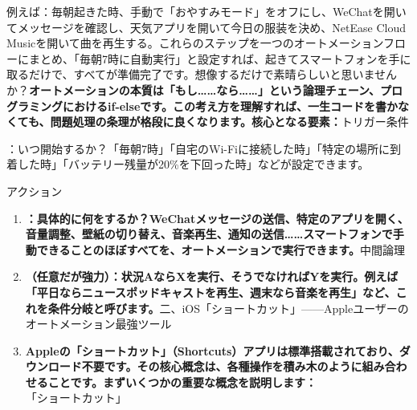 


例えば：毎朝起きた時、手動で「おやすみモード」をオフにし、WeChatを開いてメッセージを確認し、天気アプリを開いて今日の服装を決め、NetEase Cloud Musicを開いて曲を再生する。これらのステップを一つのオートメーションフローにまとめ、「毎朝7時に自動実行」と設定すれば、起きてスマートフォンを手に取るだけで、すべてが準備完了です。想像するだけで素晴らしいと思いませんか？\textbf{オートメーションの本質は「もし……なら……」という論理チェーン、プログラミングにおけるif-elseです。この考え方を理解すれば、一生コードを書かなくても、問題処理の条理が格段に良くなります。核心となる要素：}トリガー条件

：いつ開始するか？「毎朝7時」「自宅のWi-Fiに接続した時」「特定の場所に到着した時」「バッテリー残量が20\%を下回った時」などが設定できます。

アクション

\begin{enumerate}
  \item \textbf{：具体的に何をするか？WeChatメッセージの送信、特定のアプリを開く、音量調整、壁紙の切り替え、音楽再生、通知の送信……スマートフォンで手動できることのほぼすべてを、オートメーションで実行できます。}中間論理
  \item \textbf{（任意だが強力）：状況AならXを実行、そうでなければYを実行。例えば「平日ならニュースポッドキャストを再生、週末なら音楽を再生」など、これを条件分岐と呼びます。}二、iOS「ショートカット」——Appleユーザーのオートメーション最強ツール
  \item \textbf{Appleの「ショートカット」（Shortcuts）アプリは標準搭載されており、ダウンロード不要です。その核心概念は、各種操作を積み木のように組み合わせることです。まずいくつかの重要な概念を説明します：}「ショートカット」
\end{enumerate}


